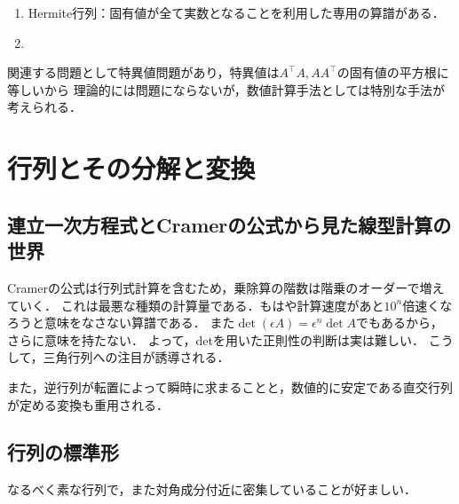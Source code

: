 \documentclass[uplatex, dvipdfmx]{jsreport}
\begin{document}
\begin{enumerate}
    \item Hermite行列：固有値が全て実数となることを利用した専用の算譜がある．
    \item 
\end{enumerate}

関連する問題として特異値問題があり，特異値は$A^\top A,AA^\top$の固有値の平方根に等しいから
理論的には問題にならないが，数値計算手法としては特別な手法が考えられる．

\chapter{行列とその分解と変換}

\section{連立一次方程式とCramerの公式から見た線型計算の世界}

\begin{tcolorbox}[colframe=ForestGreen, colback=ForestGreen!10!white,breakable,colbacktitle=ForestGreen!40!white,coltitle=black,fonttitle=\bfseries\sffamily,
title=計算量の世界：三角行列への注目]
    Cramerの公式は行列式計算を含むため，乗除算の階数は階乗のオーダーで増えていく．
    これは最悪な種類の計算量である．もはや計算速度があと$10^n$倍速くなろうと意味をなさない算譜である．
    また$\det(\epsilon A)=\epsilon^n\det A$でもあるから，さらに意味を持たない．
    よって，detを用いた正則性の判断は実は難しい．
    こうして，三角行列への注目が誘導される．
\end{tcolorbox}

また，逆行列が転置によって瞬時に求まることと，数値的に安定である直交行列が定める変換も重用される．

\section{行列の標準形}

\begin{tcolorbox}[colframe=ForestGreen, colback=ForestGreen!10!white,breakable,colbacktitle=ForestGreen!40!white,coltitle=black,fonttitle=\bfseries\sffamily,
title=]
    なるべく素な行列で，また対角成分付近に密集していることが好ましい．
\end{tcolorbox}
\end{document}
